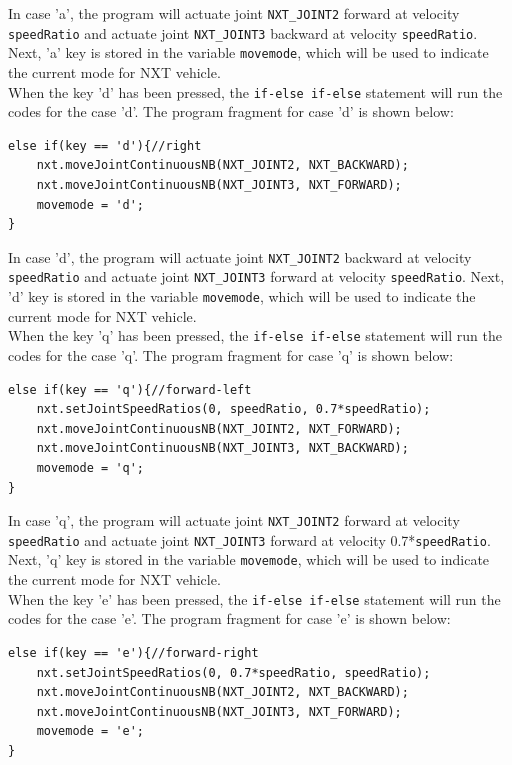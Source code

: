 \documentclass[11pt]{article}
\begin{document}
In case 'a', the program will actuate joint \verb+NXT_JOINT2+ forward at velocity \verb+speedRatio+ 
and actuate joint \verb+NXT_JOINT3+ backward at velocity \verb+speedRatio+. Next, 'a' key is stored in 
the variable \verb+movemode+, which will be used to indicate the current mode for NXT vehicle.\\ 
\newline
\noindent
When the key 'd' has been pressed, the \verb+if-else if-else+ statement will run the codes for the case 'd'.
The program fragment for case 'd' is shown below:
\begin{verbatim} 
else if(key == 'd'){//right
    nxt.moveJointContinuousNB(NXT_JOINT2, NXT_BACKWARD);
    nxt.moveJointContinuousNB(NXT_JOINT3, NXT_FORWARD);
    movemode = 'd';
}
\end{verbatim}
In case 'd', the program will actuate joint \verb+NXT_JOINT2+ backward at velocity \verb+speedRatio+ 
and actuate joint \verb+NXT_JOINT3+ forward at velocity \verb+speedRatio+. Next, 'd' key is stored in
the variable \verb+movemode+, which will be used to indicate the current mode for NXT vehicle.\\ 
\newline
\noindent
When the key 'q' has been pressed, the \verb+if-else if-else+ statement will run the codes for the case 'q'.
The program fragment for case 'q' is shown below:
\begin{verbatim} 
else if(key == 'q'){//forward-left
    nxt.setJointSpeedRatios(0, speedRatio, 0.7*speedRatio);
    nxt.moveJointContinuousNB(NXT_JOINT2, NXT_FORWARD);
    nxt.moveJointContinuousNB(NXT_JOINT3, NXT_BACKWARD);
    movemode = 'q';
}
\end{verbatim}
In case 'q', the program will actuate joint \verb+NXT_JOINT2+ forward at velocity \verb+speedRatio+ 
and actuate joint \verb+NXT_JOINT3+ forward at velocity 0.7*\verb+speedRatio+. Next, 'q' key is 
stored in the variable \verb+movemode+, which will be used to indicate the current mode for NXT 
vehicle.\\ 
\newline
\noindent 
When the key 'e' has been pressed, the \verb+if-else if-else+ statement will run the codes for the case 'e'.
The program fragment for case 'e' is shown below:
\begin{verbatim} 
else if(key == 'e'){//forward-right
    nxt.setJointSpeedRatios(0, 0.7*speedRatio, speedRatio);
    nxt.moveJointContinuousNB(NXT_JOINT2, NXT_BACKWARD);
    nxt.moveJointContinuousNB(NXT_JOINT3, NXT_FORWARD);
    movemode = 'e';
}
\end{verbatim}
\end{document}
